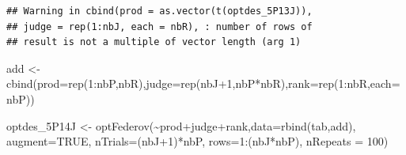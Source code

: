\documentclass[
]{krantz}
\makeatletter
\newenvironment{Shaded}{\begin{snugshade}}{\end{snugshade}}
\newcommand{\AttributeTok}[1]{\textcolor[rgb]{0.61,0.61,0.61}{#1}}
\newcommand{\ConstantTok}[1]{\textcolor[rgb]{0,0,0}{#1}}
\newcommand{\DecValTok}[1]{\textcolor[rgb]{0.06,0.06,0.06}{#1}}
\newcommand{\FunctionTok}[1]{\textcolor[rgb]{0,0,0}{#1}}
\newcommand{\NormalTok}[1]{#1}
\newcommand{\OtherTok}[1]{\textcolor[rgb]{0.37,0.37,0.37}{#1}}
\newcommand{\SpecialCharTok}[1]{\textcolor[rgb]{0,0,0}{#1}}
\newenvironment{kframe}{%
\medskip{}
\setlength{\fboxsep}{.8em}
 \def\at@end@of@kframe{}%
 \ifinner\ifhmode%
  \def\at@end@of@kframe{\end{minipage}}%
  \begin{minipage}{\columnwidth}%
 \fi\fi%
 \def\FrameCommand##1{\hskip\@totalleftmargin \hskip-\fboxsep
 \colorbox{shadecolor}{##1}\hskip-\fboxsep
     \hskip-\linewidth \hskip-\@totalleftmargin \hskip\columnwidth}%
 \MakeFramed {\advance\hsize-\width
   \@totalleftmargin\z@ \linewidth\hsize
   \@setminipage}}%
 {\par\unskip\endMakeFramed%
 \at@end@of@kframe}
\renewenvironment{Shaded}{\begin{kframe}}{\end{kframe}}
\makeatother
\begin{document}
\begin{Shaded}
\end{Shaded}

\begin{verbatim}
## Warning in cbind(prod = as.vector(t(optdes_5P13J)),
## judge = rep(1:nbJ, each = nbR), : number of rows of
## result is not a multiple of vector length (arg 1)
\end{verbatim}

\begin{Shaded}
\begin{Highlighting}[]
\NormalTok{add }\OtherTok{\textless{}{-}} \FunctionTok{cbind}\NormalTok{(}\AttributeTok{prod=}\FunctionTok{rep}\NormalTok{(}\DecValTok{1}\SpecialCharTok{:}\NormalTok{nbP,nbR),}\AttributeTok{judge=}\FunctionTok{rep}\NormalTok{(nbJ}\SpecialCharTok{+}\DecValTok{1}\NormalTok{,nbP}\SpecialCharTok{*}\NormalTok{nbR),}\AttributeTok{rank=}\FunctionTok{rep}\NormalTok{(}\DecValTok{1}\SpecialCharTok{:}\NormalTok{nbR,}\AttributeTok{each=}\NormalTok{nbP))}

\NormalTok{optdes\_5P14J }\OtherTok{\textless{}{-}} \FunctionTok{optFederov}\NormalTok{(}\SpecialCharTok{\textasciitilde{}}\NormalTok{prod}\SpecialCharTok{+}\NormalTok{judge}\SpecialCharTok{+}\NormalTok{rank,}\AttributeTok{data=}\FunctionTok{rbind}\NormalTok{(tab,add), }\AttributeTok{augment=}\ConstantTok{TRUE}\NormalTok{, }\AttributeTok{nTrials=}\NormalTok{(nbJ}\SpecialCharTok{+}\DecValTok{1}\NormalTok{)}\SpecialCharTok{*}\NormalTok{nbP,}
                          \AttributeTok{rows=}\DecValTok{1}\SpecialCharTok{:}\NormalTok{(nbJ}\SpecialCharTok{*}\NormalTok{nbP), }\AttributeTok{nRepeats =} \DecValTok{100}\NormalTok{)}
\end{Highlighting}
\end{Shaded}
\end{document}
